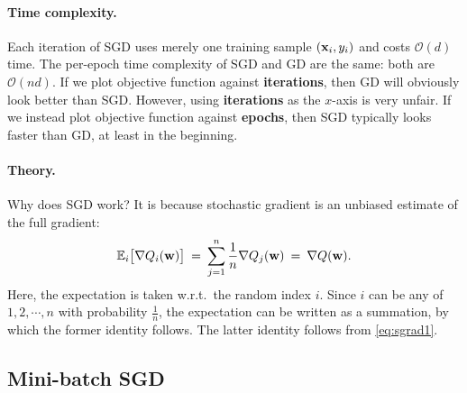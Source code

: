 \documentclass[11pt]{article}
\numberwithin{equation}{section}
\def\w{{\bf w}}
\def\x{{\bf x}}
\def\OM{{\mathcal O}}
\def\EB{{\mathbb E}}
\begin{document}
\paragraph{Time complexity.}
Each iteration of SGD uses merely one training sample $(\x_i, y_i)$ and costs $\OM (d)$ time.
The per-epoch time complexity of SGD and GD are the same: both are $\OM (n d)$.
If we plot objective function against \textbf{iterations}, then GD will obviously look better than SGD.
However, using \textbf{iterations} as the $x$-axis is very unfair.
If we instead plot objective function against \textbf{epochs}, then SGD typically looks faster than GD, at least in the beginning.


\paragraph{Theory.}
Why does SGD work?
It is because stochastic gradient is an unbiased estimate of the full gradient:
\begin{eqnarray*}
	\EB_{i} \big[ \nabla Q_i (\w ) \big]
	\: = \: \sum_{j=1}^n \frac{1}{n}  \nabla Q_j (\w ) 
	\: = \: \nabla Q (\w) .
\end{eqnarray*}
Here, the expectation is taken w.r.t.\ the random index $i$.
Since $i$ can be any of $1, 2, \cdots , n$ with probability $\frac{1}{n}$,
the expectation can be written as a summation, by which the former identity follows.
The latter identity follows from \eqref{eq:sgrad1}.







\subsection{Mini-batch SGD}
\end{document}
